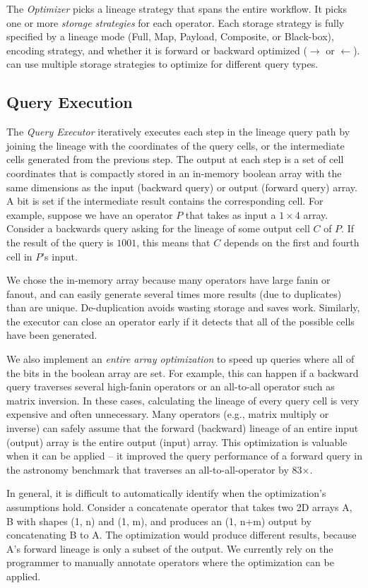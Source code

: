 The {\it Optimizer} picks a lineage strategy that spans the entire workflow. It
picks one or more {\it storage strategies} for each operator.  Each storage
strategy is fully specified by a  lineage mode (Full, Map, Payload,
Composite, or Black-box), encoding strategy, and
whether it is forward or backward optimized ($\rightarrow$ or $\leftarrow$).
\sys{} can use multiple storage strategies to optimize for different query types. 


\subsection{Query Execution}
\label{s:qexec}


The {\it Query Executor} iteratively executes each step in the lineage query
path by joining the lineage with the coordinates of the query cells, or the
intermediate cells  generated from the previous step.  The output at each step
is a set of cell coordinates that is compactly stored in an in-memory boolean
array with the same dimensions as the input (backward query) or output (forward
query) array.  A bit is set if the intermediate result contains the
corresponding cell.  For example, suppose we have an operator $P$ that takes as
input a $1\times 4$ array.  Consider a backwards query asking for the lineage
of some output cell $C$ of $P$.  If the result of the query is $1001$, this
means that $C$ depends on the first and fourth cell in $P$'s input.

We chose the in-memory array because many operators have large fanin or fanout,
and can easily generate several times more results (due to duplicates) than are
unique.  De-duplication avoids wasting storage and saves work.  Similarly, the
executor can close an operator early if it detects that all of the possible
cells have been generated.

We also implement an {\it entire array optimization} to speed up queries where
all of the bits in the boolean array are set.  For example, this can happen if
a backward query traverses several high-fanin operators or an all-to-all
operator such as matrix inversion.  In these cases,  calculating the lineage of
every query cell is very expensive and often unnecessary.  Many operators
(e.g., matrix multiply or inverse) can safely assume that the forward
(backward) lineage of an entire input (output) array is the entire output
(input) array.  This optimization is valuable when it can be applied -- it
improved the query performance of a forward query in the astronomy benchmark
that traverses an all-to-all-operator by 83$\times$.

In general, it is difficult to automatically identify when the optimization's
assumptions hold.  Consider a concatenate operator that takes two 2D arrays A,
B with shapes (1, n) and (1, m), and produces an (1, n+m) output by
concatenating B to A.  The optimization would produce different results, because
A's forward lineage is only a subset of the output.  We currently rely on the
programmer to manually annotate operators where the 
optimization can be applied. 

